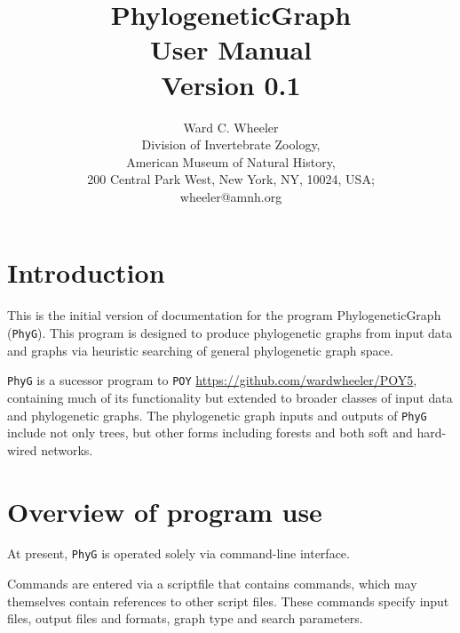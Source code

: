 \documentclass[11pt]{article}
\begin{document}
	
	\title{PhylogeneticGraph\\User Manual\\Version 0.1}
	\author{Ward C. Wheeler\\
		Division of Invertebrate Zoology,\\ American Museum of Natural History,\\ 200 Central Park West, New York, NY, 10024, USA;\\wheeler@amnh.org}
	
	
	\maketitle
	\newpage
	
	\tableofcontents
	\newpage
	\section{Introduction}
	This is the initial version of documentation for the program PhylogeneticGraph (\texttt{PhyG}).  This program is designed to produce phylogenetic graphs from input data and graphs via heuristic searching of general phylogenetic graph space.
	
	 \texttt{PhyG} is a sucessor program to \texttt{POY} \citep{POY2,POY3,POY4,Varonetal2010,POY5, Wheeleretal2015} \url{https://github.com/wardwheeler/POY5}, containing much of its functionality but extended to broader classes of input data and phylogenetic graphs.
	The phylogenetic graph inputs and outputs of \texttt{PhyG} include not only trees, but other forms including forests and both
	soft and hard-wired networks.
	
	
	
	\section{Overview of program use}
	At present, \texttt{PhyG} is operated solely via command-line interface. 
	
	Commands are entered via a scriptfile that contains commands, which may themselves contain references to other script files.
	These commands specify input files, output files and formats, graph type and search parameters. 
	
\end{document}
